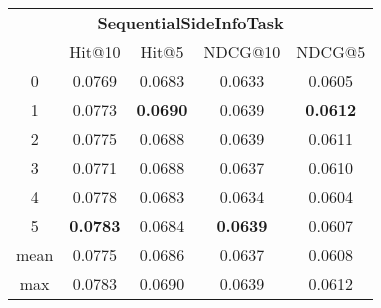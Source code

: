 \documentclass{article}
\begin{document}
 

\begin{tabular}{c|cccc}

\multicolumn{5}{c}{\textbf{SequentialSideInfoTask}} \\
\noalign{\smallskip}
\noalign{\smallskip}
\toprule
\multicolumn{1}{c}{Template ID} & \multicolumn{1}{|c}{Hit@10} & \multicolumn{1}{c}{Hit@5} & \multicolumn{1}{c}{NDCG@10} & \multicolumn{1}{c}{NDCG@5} \\
\midrule
0 & 0.0769 & 0.0683 & 0.0633 & 0.0605 \\
1 & 0.0773 & \textbf{0.0690} & 0.0639 & \textbf{0.0612} \\
2 & 0.0775 & 0.0688 & 0.0639 & 0.0611 \\
3 & 0.0771 & 0.0688 & 0.0637 & 0.0610 \\
4 & 0.0778 & 0.0683 & 0.0634 & 0.0604 \\
5 & \textbf{0.0783} & 0.0684 & \textbf{0.0639} & 0.0607 \\
\midrule
mean & 0.0775 & 0.0686 & 0.0637 & 0.0608 \\
max & 0.0783 & 0.0690 & 0.0639 & 0.0612 \\
\bottomrule

\end{tabular}
\end{document}
